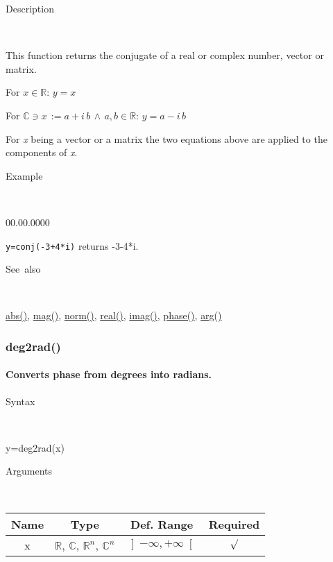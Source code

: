 \begin{description}
\item [Description]~
\end{description}
This function returns the conjugate of a real or complex number, vector
or matrix.

\medskip{}
For $x\in\mathbb{R}$: $y=x$
\medskip{}

For $\mathbb{\mathbb{C}}\ni x\,:=a+i\, b\,\wedge\, a,b\in\mathbb{R}$:
$y=a-i\, b$
\medskip{}

For \textit{x} being a vector or a matrix the two equations above
are applied to the components of \textit{x}.

\begin{description}
\item [Example]~
\end{description}
\begin{lyxlist}{00.00.0000}
\item [\texttt{y=conj(-3+4{*}i)}]returns -3-4{*}i.
\end{lyxlist}
\begin{description}
\item [See~also]~
\end{description}
\textcolor{blue}{\hyperlink{abs}{abs()}}, \textcolor{blue}{\hyperlink{mag}{mag()}},
\textcolor{blue}{\hyperlink{norm}{norm()}}, \textcolor{blue}{\hyperlink{real}{real()}},
\textcolor{blue}{\hyperlink{imag}{imag()}}, \textcolor{blue}{\hyperlink{phase}{phase()}},
\textcolor{blue}{\hyperlink{arg}{arg()}}


\newpage
\subsubsection*{\hypertarget{deg2rad}{}{\Large deg2rad()}}


\paragraph{\label{par:deg2rad}Converts phase from degrees into radians.}

\begin{description}
\item [Syntax]~
\end{description}
y=deg2rad(x)

\begin{description}
\item [Arguments]~
\end{description}
\begin{tabular}{|c|c|c|c|}
\hline 
Name&
Type&
Def. Range&
Required\tabularnewline
\hline
\hline 
x&
$\mathbb{R}$, $\mathbb{C}$, $\mathbb{R}^{n}$, $\mathbb{C}^{n}$ &
$\left]-\infty,+\infty\right[$&
$\surd$\tabularnewline
\hline
\end{tabular}

